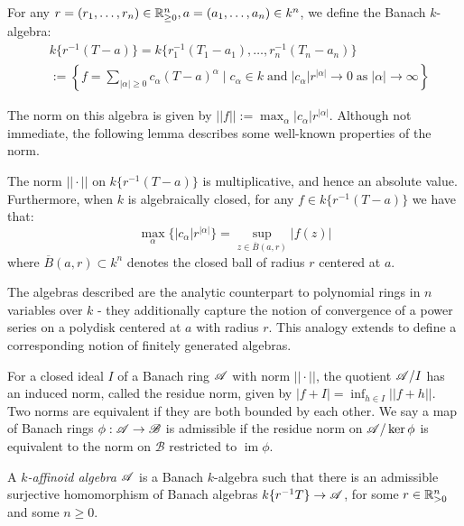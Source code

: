 For any $r = (r_1, \dots, r_n) \in \mathbb{R}_{\geq 0}^n, a = (a_1, \dots, a_n) \in k^n$, we define the Banach $k$-algebra:
\begin{align*}
& k\{r^{-1}({T} -  {a})\} = k\{r_1^{-1}(T_1 - a_1), \dots, r_n^{-1}(T_n - a_n)\} \\ & := \left\{
    f = \sum\limits_{|\alpha| \geq 0} c_{\alpha}( {T} -  {a})^{\alpha} \; \vert \;
        c_{\alpha} \in k \; \text{and} \; |c_{\alpha}| r^{|\alpha|} \to 0 \; \text{as} \; |\alpha| \to \infty
\right\}
\end{align*}

The norm on this algebra is given by $||f|| := \max_{\alpha} |c_{\alpha}|  {r}^{|\alpha|}$. Although not immediate, the following lemma describes some well-known properties of the norm.

\begin{lemma}\label{tatealgnorm}\parencite[\S 6.1.5]{bgr}
    The norm $||\cdot||$ on $k\{ {r}^{-1}( {T} -  {a})\}$ is multiplicative, and hence an absolute value. Furthermore, when $k$ is algebraically closed, for any $f \in k\{r^{-1}(T - a)\}$ we have that:
    \[
    \max_{\alpha} \{ |c_{\alpha}|  {r}^{|\alpha|} \} = \sup_{z \in \overline{B}(a, r)} |f(z)|
    \]
    where $\overline{B}(a, r) \subset k^n$ denotes the closed ball of radius $r$ centered at $a$.
\end{lemma}

The algebras described are the analytic counterpart to polynomial rings in $n$ variables over $k$ - they additionally capture the notion of convergence of a power series on a polydisk centered at $a$ with radius $r$. This analogy extends to define a corresponding notion of finitely generated algebras.

For a closed ideal $I$ of a Banach ring $\mathscr{A}$ with norm $||\cdot||$, the quotient $\mathscr{A}/I$ has an induced norm, called the residue norm, given by $|f + I| = \inf_{h \in I} ||f + h||$. 
Two norms are equivalent if they are both bounded by each other. We say a map of Banach rings $\phi: \mathscr{A} \to \mathscr{B}$ is admissible if the residue norm on $\mathscr{A}/\ker \phi$ is equivalent to the norm on $\mathscr{B}$ restricted to $\operatorname{im} \phi$. 

\begin{defn}\parencite[\S 2.1]{berk1}
    A \textit{$k$-affinoid algebra} $\mathscr{A}$ is a Banach $k$-algebra such that there is an admissible surjective homomorphism of Banach algebras $k\{ {r}^{-1} {T}\} \to \mathscr{A}$, for some $ {r} \in \mathbb{R}_{> 0}^n$ and some $n \geq 0$.
\end{defn}


